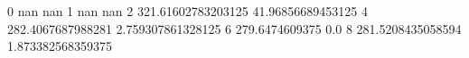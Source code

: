 0 nan nan
1 nan nan
2 321.61602783203125 41.96856689453125
4 282.4067687988281 2.759307861328125
6 279.6474609375 0.0
8 281.5208435058594 1.873382568359375
